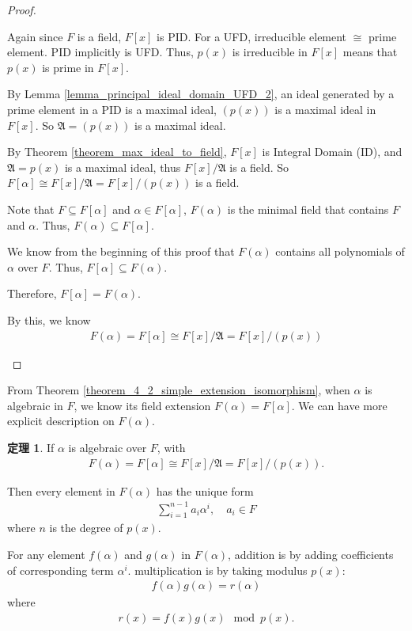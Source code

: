 \documentclass[utf8]{ctexbook}
\theoremstyle{definition}
\newtheorem{prototheorem}{定理}[section]
\newenvironment{theorem}
   {\colorlet{shadecolor}{red!30}\begin{shaded}\begin{prototheorem}}
   {\end{prototheorem}\end{shaded}}
\begin{document}
\begin{proof}
\begin{enumerate}
{Again since $F$ is a field, $F[x]$ is PID. For a UFD, irreducible element $\cong$ prime element. PID implicitly is UFD. Thus, $p(x)$ is irreducible in $F[x]$ means that $p(x)$ is prime in $F[x]$.

By Lemma \ref{lemma_principal_ideal_domain_UFD_2}, an ideal generated by a prime element in a PID is a maximal ideal, $(p(x))$ is a maximal ideal in $F[x]$. So $\mathfrak{A}= (p(x))$ is a maximal ideal.

By Theorem \ref{theorem_max_ideal_to_field}, $F[x]$ is Integral Domain (ID), and $\mathfrak{A} = p(x)$ is a maximal ideal, thus $F[x] / \mathfrak{A}$ is a field. So $F[\alpha] \cong F[x] / \mathfrak{A} = F[x] / (p(x))$ is a field.

Note that $F \subseteq F[\alpha]$ and $\alpha \in F[\alpha]$, $F(\alpha)$ is the minimal field that contains $F$ and $\alpha$. Thus, $F(\alpha) \subseteq F[\alpha]$.

We know from the beginning of this proof that $F(\alpha)$ contains all polynomials of $\alpha$ over $F$. Thus, $F[\alpha] \subseteq F(\alpha)$.

Therefore, $F[\alpha] = F(\alpha)$.

By this, we know
\begin{align*}
F(\alpha) = F[\alpha] \cong F[x] / \mathfrak{A} = F[x] / (p(x))
\end{align*}

}
\end{enumerate}


\end{proof}

From Theorem \ref{theorem_4_2_simple_extension_isomorphism}, when $\alpha$ is algebraic in $F$, we know its field extension $F(\alpha) = F[\alpha]$. We can have more explicit description on $F(\alpha)$.

\begin{theorem}
\label{theorem_4_2_simple_algebraic_extension_explicit}
If $\alpha$ is algebraic over $F$, with
\begin{align*}
F(\alpha) = F[\alpha] \cong F[x] / \mathfrak{A} = F[x] / (p(x)) .
\end{align*}

Then every element in $F(\alpha)$ has the unique form
\begin{align*}
\sum_{i=1} ^{n-1} a_i \alpha^i, \quad a_i \in F
\end{align*}
where $n$ is the degree of $p(x)$.

For any element $f(\alpha)$ and $g(\alpha)$ in $F(\alpha)$, addition is by adding coefficients of corresponding term $\alpha^i$. multiplication is by taking modulus $p(x)$:
\begin{align*}
f(\alpha) g(\alpha) = r(\alpha)
\end{align*}
where
\begin{align*}
r(x) = f(x) g(x) \mod p(x).
\end{align*}
\end{theorem}
\end{document}
